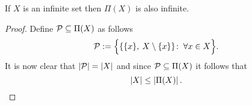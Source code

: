\begin{rem}\label{rem:partfinsze}
  If $X$ is an infinite set then $\Pi(X)$ is also infinite.
\end{rem}

\begin{proof}
  Define $\P \subseteq \Pi(X)$ as follows
  \begin{equation*}
    \P := \Big\{ \{ \{x\}, \: X\setminus\{x\}\}\colon \: \forall x \in X \Big\}.
  \end{equation*}
  It is now clear that $\left| \P \right| = \left| X \right|$ and since $\P \subseteq \Pi(X)$ it follows that 
  \begin{equation*}
    \left| X \right| \leq \left| \Pi(X) \right|.\qedhere
  \end{equation*}
\end{proof}
